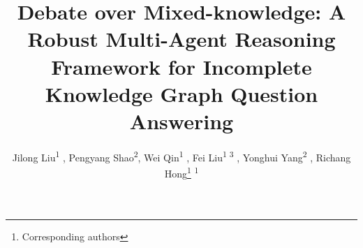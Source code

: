 

\title{Debate over Mixed-knowledge: A Robust Multi-Agent Reasoning Framework for Incomplete Knowledge Graph Question Answering}

\newcommand{\shortname}{DoM}
\newcommand{\fullname}{Multi-agent \textbf{D}ebate \textbf{o}n Knowledge \textbf{G}raph}

\author{
    Jilong Liu\textsuperscript{\rm 1} , 
    Pengyang Shao\footnotemark[1] \textsuperscript{\rm 2}, 
    Wei Qin\textsuperscript{\rm 1} , 
    Fei Liu\textsuperscript{\rm 1 3} , 
    Yonghui Yang\textsuperscript{\rm 2} , 
    Richang Hong\thanks{Corresponding authors} \textsuperscript{\rm 1}
}

